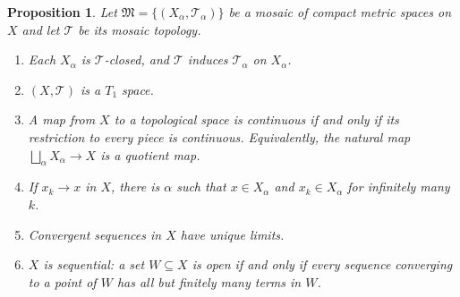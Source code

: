 \documentclass[11pt]{amsart}
\newtheorem{proposition}[theorem]{Proposition}
\theoremstyle{definition}
\theoremstyle{remark}
\newcommand{\cT}{\mathcal{T}}
\newcommand{\fM}{\mathfrak{M}}
\numberwithin{equation}{section}
\begin{document}
\begin{proposition}\label{prop:basic}
Let $\fM=\{(X_\alpha,\cT_\alpha)\}$ be a mosaic of compact metric spaces on $X$ and let $\cT$ be its mosaic topology.
\begin{enumerate}[label=\textup{(\arabic*)}]
\item Each $X_\alpha$ is $\cT$-closed, and $\cT$ induces $\cT_\alpha$ on $X_\alpha$.
\item $(X,\cT)$ is a $T_1$ space.
\item A map from $X$ to a topological space is continuous if and only if its restriction to every piece is continuous. Equivalently, the natural map $\bigsqcup_\alpha X_\alpha\to X$ is a quotient map.
\item If $x_k\to x$ in $X$, there is $\alpha$ such that $x\in X_\alpha$ and $x_k\in X_\alpha$ for infinitely many $k$.
\item Convergent sequences in $X$ have unique limits.
\item $X$ is sequential: a set $W\subseteq X$ is open if and only if every sequence converging to a point of $W$ has all but finitely many terms in $W$.
\end{enumerate}
\end{proposition}
\end{document}

